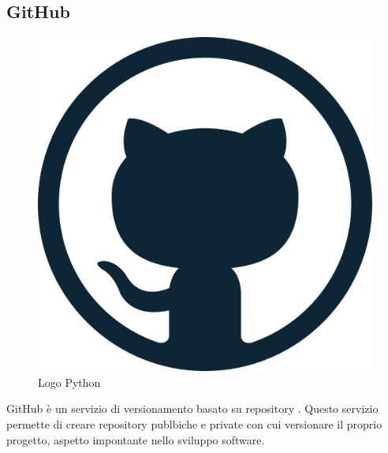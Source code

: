 \subsection{GitHub}
\begin{figure}[H]
	\begin{center} \includegraphics[scale=0.2]{figures/github-logo}
		\caption[Bin packing figures]{Logo Python}  
	\end{center}
\end{figure}
GitHub è un servizio di versionamento basato su repository . Questo servizio permette di creare repository publbiche e private con cui versionare il proprio progetto, aspetto impontante nello sviluppo software.

